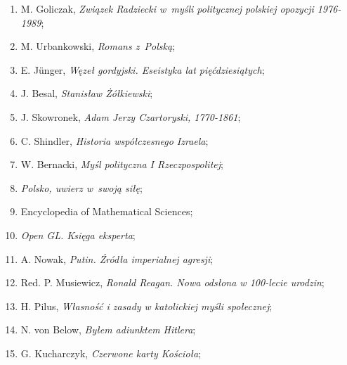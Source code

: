 \documentclass[a4paper,11pt]{article}
\begin{document}
\begin{enumerate}
\item M. Goliczak, \textit{Związek Radziecki w~myśli politycznej
    polskiej opozycji 1976-1989};



\item M. Urbankowski, \textit{Romans z~Polską};



\item E. J\"{u}nger, \textit{Węzeł gordyjski. Eseistyka lat
    pięćdziesiątych};



\item J. Besal, \textit{Stanisław Żółkiewski};



\item J. Skowronek, \textit{Adam Jerzy Czartoryski, 1770-1861};



\item C. Shindler, \textit{Historia współczesnego Izraela};



\item W. Bernacki, \textit{Myśl polityczna I Rzeczpospolitej};



\item \textit{Polsko, uwierz w~swoją siłę};



\item Encyclopedia of Mathematical Sciences;



\item \textit{Open GL. Księga eksperta};



\item A. Nowak, \textit{Putin. Źródła imperialnej agresji};



\item Red. P. Musiewicz, \textit{Ronald Reagan. Nowa odsłona w 100-lecie
    urodzin};



\item H. Pilus, \textit{Własność i zasady w katolickiej myśli
    społecznej};



\item N. von Below, \textit{Byłem adiunktem Hitlera};



\item G. Kucharczyk, \textit{Czerwone karty Kościoła};




\end{enumerate}
\end{document}
